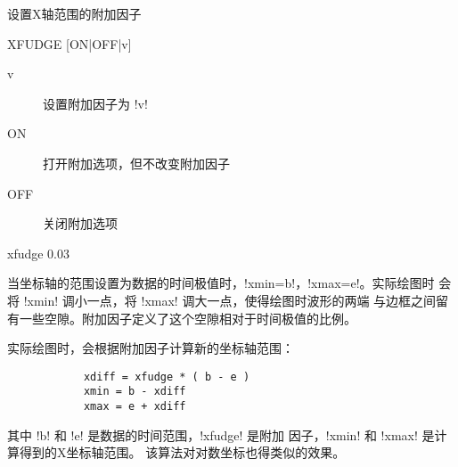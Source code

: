 \label{cmd:xfudge}

设置X轴范围的附加因子

\begin{SACSTX}
XFUDGE [ON|OFF|v]
\end{SACSTX}

\begin{description}
\item [v] 设置附加因子为 !v!
\item [ON] 打开附加选项，但不改变附加因子
\item [OFF] 关闭附加选项
\end{description}

\begin{SACDFT}
xfudge 0.03
\end{SACDFT}

当坐标轴的范围设置为数据的时间极值时，!xmin=b!，!xmax=e!。实际绘图时
会将 !xmin! 调小一点，将 !xmax! 调大一点，使得绘图时波形的两端
与边框之间留有一些空隙。附加因子定义了这个空隙相对于时间极值的比例。

实际绘图时，会根据附加因子计算新的坐标轴范围：
\begin{verbatim}
            xdiff = xfudge * ( b - e )
            xmin = b - xdiff
            xmax = e + xdiff
\end{verbatim}
其中 !b! 和 !e! 是数据的时间范围，!xfudge! 是附加
因子，!xmin! 和 !xmax! 是计算得到的X坐标轴范围。
该算法对对数坐标也得类似的效果。
